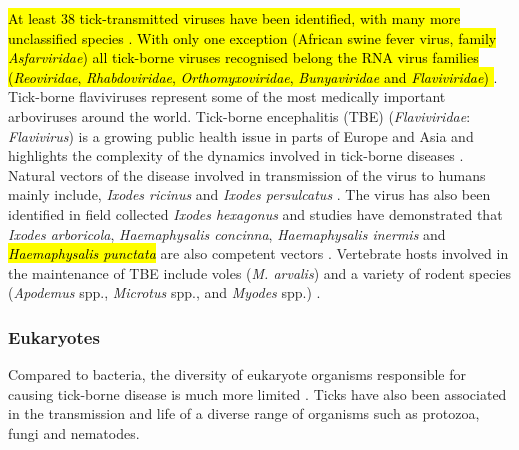 \documentclass[a4paper, nobind]{templates/ociamthesis}
\begin{document}
\hl{At least 38 tick-transmitted viruses have been identified, with many more unclassified species \autocite{labudaTickborneViruses2004}. With only one exception (African swine fever virus, family \emph{Asfarviridae}) all tick-borne viruses recognised belong the RNA virus families (\emph{Reoviridae}, \emph{Rhabdoviridae}, \emph{Orthomyxoviridae}, \emph{Bunyaviridae} and \emph{Flaviviridae}) \autocite{labudaTickborneViruses2004}}.
Tick-borne flaviviruses represent some of the most medically important arboviruses around the world.
Tick-borne encephalitis (TBE) (\emph{Flaviviridae}: \emph{Flavivirus}) is a growing public health issue in parts of Europe and Asia and highlights the complexity of the dynamics involved in tick-borne diseases \autocite{gritsunTickborneEncephalitis2003}.
Natural vectors of the disease involved in transmission of the virus to humans mainly include, \emph{Ixodes ricinus} and \emph{Ixodes persulcatus} \autocite{labudaTickborneViruses2004,sussTickborneEncephalitis20102011}.
The virus has also been identified in field collected \emph{Ixodes hexagonus} and studies have demonstrated that \emph{Ixodes arboricola}, \emph{Haemaphysalis concinna}, \emph{Haemaphysalis inermis} and \hl{\emph{Haemaphysalis punctata}} are also competent vectors \autocite{gresikovaTickborneEncephalitis1998}.
Vertebrate hosts involved in the maintenance of TBE include voles (\emph{M. arvalis}) and a variety of rodent species (\emph{Apodemus} spp., \emph{Microtus} spp., and \emph{Myodes} spp.) \autocite{achaziRodentsSentinelsPrevalence2011}.

\hypertarget{eukaryotes}{%
\subsubsection{Eukaryotes}\label{eukaryotes}}

Compared to bacteria, the diversity of eukaryote organisms responsible for causing tick-borne disease is much more limited \autocite{tokarzDiscoverySurveillanceTickBorne2021}.
Ticks have also been associated in the transmission and life of a diverse range of organisms such as protozoa, fungi and nematodes.
\end{document}
